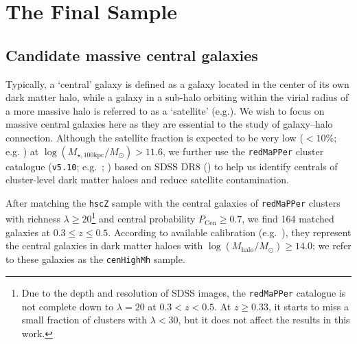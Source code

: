 \documentclass[fleqn,usenatbib]{mnras}
\def\redm{\texttt{redMaPPer}}
\def\rbcg{\texttt{cenHighMh}}
\def\logmtot{{$\log (M_{\star,100\mathrm{kpc}}/M_{\odot})$}}
\begin{document}
\section{The Final Sample}
    \label{sec:final}
    
\subsection{Candidate massive central galaxies}
    \label{ssec:redmapper}
    
    Typically, a `central' galaxy is defined as a galaxy located in the center of 
    its own dark matter halo, while a galaxy in a sub-halo orbiting within 
    the virial radius of a more massive halo is referred to as a `satellite' 
    (e.g.\citealt{Yang2007}).
    We wish to focus on massive central galaxies here as they are essential
    to the study of galaxy--halo connection.
    Although the satellite fraction is expected to be very low ($<10$\%; e.g. 
    \citealt{Reid2014, Hoshino2015, Saito2016}) at \logmtot{}$> 11.6$, we further use 
    the \redm{} cluster catalogue (\texttt{v5.10}; e.g.\ \citealt{Rykoff2014}; 
    \citealt{Rozo2015b}) based on SDSS DR8 (\citealt{SDSS-DR8}) to help us 
    identify centrals of cluster-level dark matter haloes and reduce satellite
    contamination.
       
    After matching the \texttt{hscZ} sample with the central galaxies of \redm{} 
    clusters with richness $\lambda \geq 20$\footnote{Due to the depth and 
    resolution of SDSS images, the \redm{} catalogue is not complete down to 
    $\lambda=20$ at $0.3 < z < 0.5$.  
    At $z \geq 0.33$, it starts to miss a small fraction of clusters with 
    $\lambda < 30$, but it does not affect the results in this work.}
    and central probability $P_{\mathrm{Cen}} \geq 0.7$, we find 164 matched galaxies 
    at $0.3 \leq z \leq 0.5$.
    According to available calibration (e.g.\ \citealt{Saro2015, Farahi2016, 
    Simet2016, Melchior2016}), they represent the central galaxies in dark matter 
    haloes with $\log (M_{\mathrm{halo}}/M_{\odot}) \geq 14.0$; we refer to these 
    galaxies as the \rbcg{} sample. 
   
\end{document}
